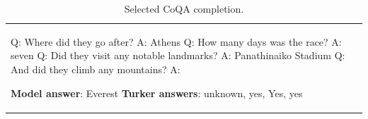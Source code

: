 \documentclass{article}
\begin{document}
\begin{table}[t]
\begin{center}
\begin{tabular}{|p{16cm}|}
Q: Where did they go after?
\newline
A: Athens
\newline\newline
Q: How many days was the race?
\newline
A: seven
\newline\newline
Q: Did they visit any notable landmarks?
\newline
A: Panathinaiko Stadium
\newline\newline
Q: And did they climb any mountains?
\newline
A:

\phantom \newline\newline

\textbf{Model answer}: Everest \newline
\textbf{Turker answers}: unknown, yes, Yes, yes

\cline{1-14}

\end{tabular}
\caption{
Selected CoQA completion.
}
\label{coqa1}
\end{center}
\end{table}
\end{document}

